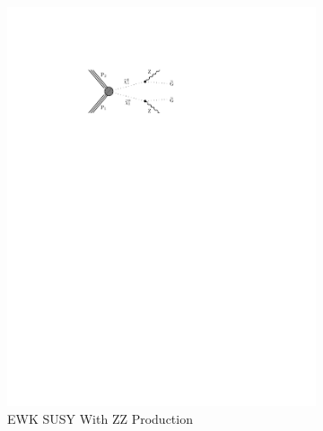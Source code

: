\begin{figure}[!h]
\begin{subfigure}[b]{0.49\textwidth}
        \label{fig:tchiwz_diagram_interpretations}
      \end{subfigure} \\
      \begin{subfigure}[b]{0.49\textwidth}
        \includegraphics[width=\textwidth]{figures/diagrams/TChiZZ.pdf}
        \caption{EWK SUSY With ZZ Production}
        \label{fig:tchizz_diagram_interpretations}
      \end{subfigure}
      \begin{subfigure}[b]{0.49\textwidth}

\end{subfigure}
\end{figure}
